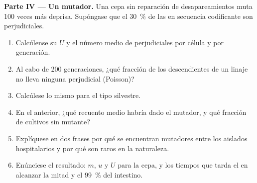 \begin{problem}
\medskip
\noindent\textbf{Parte IV --- Un mutador.}
Una cepa sin reparación de desapareamientos muta \num{100} veces más
deprisa. Supóngase que el \qty{30}{\%} de las  en secuencia
codificante son perjudiciales.
\begin{enumerate}[resume]
  \item Calcúlense su $U$ y el número medio de  perjudiciales
        por célula y por generación.
  \item Al cabo de \num{200} generaciones, ¿qué fracción de los
        descendientes de un linaje no lleva ninguna  perjudicial
        (Poisson)?
  \item Calcúlese lo mismo para el tipo silvestre.
  \item En el  anterior, ¿qué recuento medio habría
        dado el mutador, y qué fracción de cultivos sin mutante?
  \item Explíquese en dos frases por qué se encuentran mutadores entre los
        aislados hospitalarios y por qué son raros en la naturaleza.
  \item Enúnciese el resultado: $m$, $u$ y $U$ para la cepa, y los tiempos
        que tarda el  en alcanzar la mitad y el \qty{99}{\%} del
        intestino.
\end{enumerate}
\end{problem}
